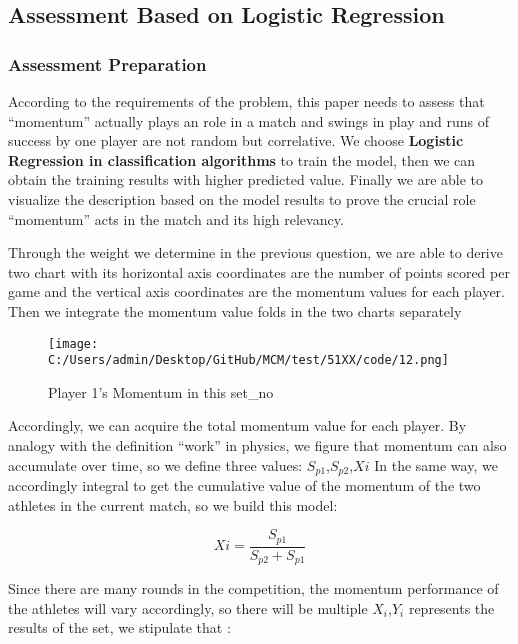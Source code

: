 \documentclass{mcmthesis}
\begin{document}
\subsection{Assessment Based on Logistic Regression}

\subsubsection{Assessment Preparation}

    According to the requirements of the problem, this paper needs to assess that “momentum”
actually plays an role in a match and swings in play and runs of success by one player are not
random but correlative. We choose {\bf Logistic Regression in classification algorithms} to train the
model, then we can obtain the training results with higher predicted value. Finally we are able to
visualize the description based on the model results to prove the crucial role “momentum” acts in
the match and its high relevancy.  

    Through the weight we determine in the previous question, we are able to derive two chart
with its horizontal axis coordinates are the number of points scored per game and the vertical axis
coordinates are the momentum values for each player. Then we integrate the momentum value
folds in the two charts separately

\begin{figure}[h]   
\centering          
\texttt{[image: C:/Users/admin/Desktop/GitHub/MCM/test/51XX/code/12.png]}
\caption{Player 1’s Momentum in this set\_no} \label{fig7}    
\end{figure} 

    Accordingly, we can acquire the total momentum value for each player. 
    By analogy with the definition “work” in physics, we figure that momentum can also
accumulate over time, so we define three values: $S_{p1}$,$S_{p2}$,$X{i}$
    In the same way, we accordingly integral to get the cumulative value of the momentum of the
two athletes in the current match, so we build this model:  

\begin{equation} \label{eq3}
    X{i} = \frac{S_{p1}}{S_{p2}+S_{p1}}
\end{equation}

    Since there are many rounds in the competition, the momentum performance of the athletes
will vary accordingly, so there will be multiple $X_i$,$Y_i$ represents the results of the set, we stipulate
that :
\end{document}
